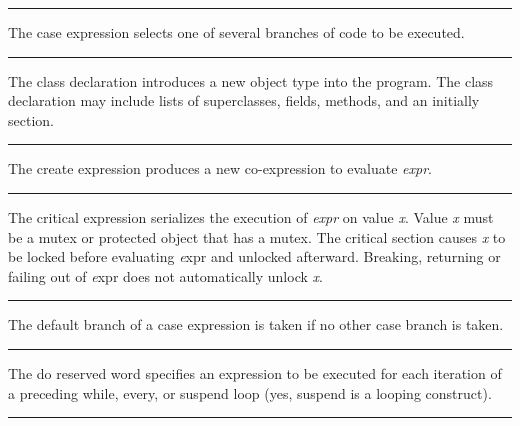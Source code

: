 \bigskip\hrule\vspace{0.1cm}

\noindent
The \textsf{case} expression selects one of
several branches of code to be executed.

\bigskip\hrule\vspace{0.1cm}

\noindent
{}The \textsf{class} declaration introduces a new
object type into the program. The \textsf{class} declaration may
include lists of superclasses, fields, methods, and an
initially section.

\bigskip\hrule\vspace{0.1cm}

\noindent
{}The \textsf{create} expression produces a new
co-expression to evaluate \textit{expr}.

\bigskip\hrule\vspace{0.1cm}

\noindent
{}The \textsf{critical} expression serializes the
execution of \textit{expr} on value {\textit x}. Value {\textit x} must
be a mutex or protected object that has a mutex. The critical section
causes {\textit x} to be locked before evaluating {\textit expr} and
unlocked afterward. Breaking, returning or failing out of {\textit expr} 
does not automatically unlock {\textit x}.

\bigskip\hrule\vspace{0.1cm}

\noindent
{}The \textsf{default} branch of a case
expression is taken if no other case branch is taken.

\bigskip\hrule\vspace{0.1cm}

\noindent
{}The \textsf{do} reserved word specifies an
expression to be executed for each iteration of a preceding
\textsf{while}, \textsf{every}, or \textsf{suspend} loop (yes,
\textsf{suspend} is a looping construct).

\bigskip\hrule\vspace{0.1cm}

